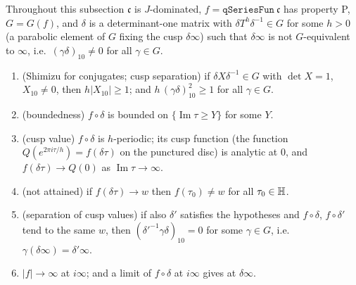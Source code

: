 Throughout this subsection $\mathfrak c$ is $J$-dominated, $f=\mathtt{qSeriesFun}\ \mathfrak c$ has property P, $G=G(f)$, and $\delta$ is a determinant-one matrix
with $\delta T^h\delta^{-1}\in G$ for some $h>0$ (a parabolic element of $G$ fixing the cusp $\delta\infty$) such that $\delta\infty$ is not
$G$-equivalent to $\infty$, i.e.\ $(\gamma\delta)_{10}\ne0$ for all $\gamma\in G$.

\begin{theorem}[Cusps]\label{ch19:thm:cusps}
\begin{enumerate}[label=(\alph*)]
\item (Shimizu for conjugates; cusp separation) if $\delta X\delta^{-1}\in G$ with $\det X=1$, $X_{10}\ne0$, then $h|X_{10}|\ge1$; and
  $h\,(\gamma\delta)_{10}^2\ge1$ for all $\gamma\in G$.
\item (boundedness) $f\circ\delta$ is bounded on $\{\operatorname{Im}\tau\ge Y\}$ for some $Y$.
\item (cusp value) $f\circ\delta$ is $h$-periodic; its cusp function (the function $Q(e^{2\pi i\tau/h})=f(\delta\tau)$ on the punctured disc) is
  analytic at $0$, and $f(\delta\tau)\to Q(0)$ as $\operatorname{Im}\tau\to\infty$.
\item (not attained) if $f(\delta\tau)\to w$ then $f(\tau_0)\ne w$ for all $\tau_0\in\mathbb{H}$.
\item (separation of cusp values) if also $\delta'$ satisfies the hypotheses and $f\circ\delta$, $f\circ\delta'$ tend to the same $w$, then
  $(\delta'^{-1}\gamma\delta)_{10}=0$ for some $\gamma\in G$, i.e.\ $\gamma(\delta\infty)=\delta'\infty$.
\item $|f|\to\infty$ at $i\infty$; and a limit of $f\circ\delta$ at $i\infty$ gives  at $\delta\infty$.
\end{enumerate}
\end{theorem}
